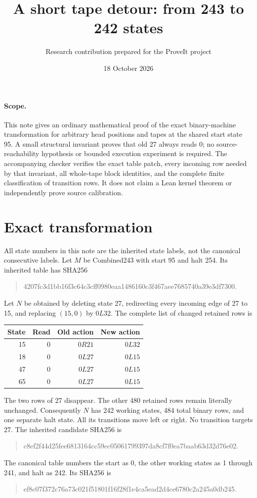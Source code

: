 \documentclass[11pt]{article}
\title{A short tape detour: from 243 to 242 states}
\author{Research contribution prepared for the ProveIt project}
\date{18 October 2026}
\begin{document}
\maketitle

\paragraph{Scope.}
This note gives an ordinary mathematical proof of the exact binary-machine
transformation for arbitrary head positions and tapes at the shared start
state 95. A small structural invariant proves that old 27 always reads 0;
no source-reachability hypothesis or bounded execution experiment is
required. The accompanying checker verifies the exact table patch, every
incoming row needed by that invariant, all whole-tape block identities,
and the complete finite classification of transition rows. It does not
claim a Lean kernel theorem or independently prove source calibration.

\section{Exact transformation}

All state numbers in this note are the inherited state labels, not the
canonical consecutive labels. Let $M$ be Combined243 with start 95 and
halt 254. Its inherited table has SHA256
\begin{quote}\ttfamily\small
4207fc3d1bb16f3c64c3cff0980eaa1486160c3f467aee7685740a39e3df7300.
\end{quote}
Let $N$ be obtained by deleting state 27, redirecting every incoming edge of 27
to 15, and replacing $(15,0)$ by $0L32$. The complete list of changed
retained rows is
\begin{center}
\begin{tabular}{rrrr}
\toprule
State&Read&Old action&New action\\
\midrule
15&0&$0R21$&$0L32$\\
18&0&$0L27$&$0L15$\\
47&0&$0L27$&$0L15$\\
65&0&$0L27$&$0L15$\\
\bottomrule
\end{tabular}
\end{center}
The two rows of 27 disappear. The other 480 retained rows remain literally
unchanged. Consequently $N$ has 242 working states, 484 total binary rows,
and one separate halt state. All its transitions move left or right. No
transition targets 27. The inherited candidate SHA256 is
\begin{quote}\ttfamily\small
c8ef2f44d25fee6813164cc59ec05061799397da8cf7f0ea7baab63d32d76e02.
\end{quote}
The canonical table numbers the start as 0, the other working states as
1 through 241, and halt as 242. Its SHA256 is
\begin{quote}\ttfamily\small
ef8c07f372c76a73c021f51801f16f28f1e4ca5ead2d4ce6780c2a245a0db245.
\end{quote}
\end{document}
